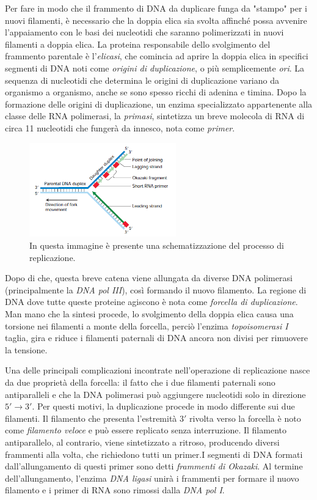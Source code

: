 \documentclass[11pt]{report}
\begin{document}
	Per fare in modo che il frammento di DNA da duplicare funga da "stampo" per i nuovi filamenti, è necessario che la doppia elica sia svolta affinché possa avvenire l'appaiamento con le basi dei nucleotidi che saranno polimerizzati in nuovi filamenti a doppia elica. La proteina responsabile dello svolgimento del frammento parentale è l'\textit{elicasi}, che comincia ad aprire la doppia elica in specifici segmenti di DNA noti come \textit{origini di duplicazione}, o più semplicemente \textit{ori}. La sequenza di nucleotidi che determina le origini di duplicazione variano da organismo a organismo, anche se sono spesso ricchi di adenina e timina. Dopo la formazione delle origini di duplicazione, un enzima specializzato appartenente alla classe delle RNA polimerasi, la \textit{primasi}, sintetizza un breve molecola di RNA di circa 11 nucleotidi che fungerà da innesco, nota come \textit{primer}. 
	\begin{figure}
		\includegraphics[width=2.5in]{replicazioneDNA.png}
		\caption{{\small In questa immagine è presente una schematizzazione del processo di replicazione.\cite{lodish2008molecular}}}
	\end{figure}
	Dopo di che, questa breve catena viene allungata da diverse DNA polimerasi (principalmente la \textit{DNA pol III}), così formando il nuovo filamento. La regione di DNA dove tutte queste proteine agiscono è nota come \textit{forcella di duplicazione}. Man mano che la sintesi procede, lo svolgimento della doppia elica causa una torsione nei filamenti a monte della forcella, perciò l'enzima \textit{topoisomerasi I} taglia, gira e riduce i filamenti paternali di DNA ancora non divisi per rimuovere la tensione.
	
	Una delle principali complicazioni incontrate nell'operazione di replicazione nasce da due proprietà della forcella: il fatto che i due filamenti paternali sono antiparalleli e che la DNA polimerasi può aggiungere nucleotidi solo in direzione $5' \rightarrow 3'$. Per questi motivi, la duplicazione procede in modo differente sui due filamenti. Il filamento che presenta l'estremità $3'$ rivolta verso la forcella è noto come \textit{filamento veloce} e può essere replicato senza interruzione. Il filamento antiparallelo, al contrario, viene sintetizzato a ritroso, producendo diversi frammenti alla volta, che richiedono tutti un primer.I segmenti di DNA formati dall'allungamento di questi primer sono detti \textit{frammenti di Okazaki}. Al termine dell'allungamento, l'enzima \textit{DNA ligasi} unirà i frammenti per formare il nuovo filamento e i primer di RNA sono rimossi dalla \textit{DNA pol I}.\\
	
\end{document}
